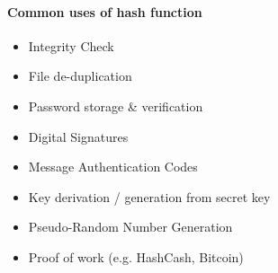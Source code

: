 \paragraph{Common uses of hash function}
\begin{itemize}
  \item Integrity Check
  \item File de-duplication
  \item Password storage \& verification
  \item Digital Signatures
  \item Message Authentication Codes
  \item Key derivation / generation from secret key
  \item Pseudo-Random Number Generation
  \item Proof of work (e.g. HashCash, Bitcoin)
\end{itemize}
